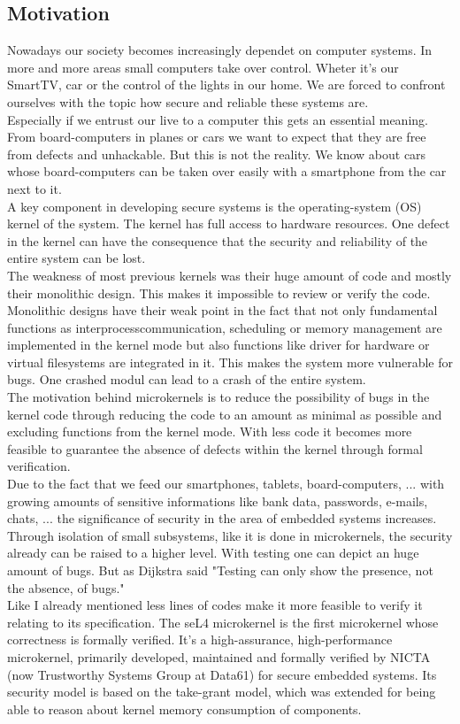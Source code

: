 \documentclass[11pt,a4paper,twoside]{article}
\begin{document}
	\subsection{Motivation}
Nowadays our society becomes increasingly dependet on computer systems. In more and more areas small computers take over control. Wheter it's our SmartTV, car or the control of the lights in our home. We are forced to confront ourselves with the topic how secure and reliable these systems are. \\
Especially if we entrust our live to a computer this gets an essential meaning. From board-computers in planes or cars we want to expect that they are free from defects and unhackable. But this is not the reality. We know about cars whose board-computers can be taken over easily with a smartphone from the car next to it. \\
A key component in developing secure systems is the operating-system (OS) kernel of the system. The kernel has full access to hardware resources. One defect in the kernel can have the consequence that the security and reliability of the entire system can be lost. \\
The weakness of most previous kernels was their huge amount of code and mostly their monolithic design. This makes it impossible to review or verify the code. Monolithic designs have their weak point in the fact that not only fundamental functions as interprocesscommunication, scheduling or memory management are implemented in the kernel mode but also functions like driver for hardware or virtual filesystems are integrated in it. This makes the system more vulnerable for bugs. One crashed modul can lead to a crash of the entire system. \\
The motivation behind microkernels is to reduce the  possibility of bugs in the kernel code through reducing the code to an amount as minimal as possible and excluding functions from the kernel mode. With less code it becomes more feasible to guarantee the absence of defects within the kernel through formal verification.\\
Due to the fact that we feed our smartphones, tablets, board-computers, ... with growing amounts of sensitive informations like bank data, passwords, e-mails, chats, ... the significance of security in the area of embedded systems increases. \\
Through isolation of small subsystems, like it is done in microkernels, the security already can be raised to a higher level. With testing one can depict an huge amount of bugs. But as Dijkstra said "Testing can only show the presence, not the absence, of bugs." \cite{EngTec} \\
Like I already mentioned less lines of codes make it more feasible to verify it relating to its specification. 
The seL4 microkernel is the first microkernel whose correctness is formally verified. It's a high-assurance, high-performance microkernel, primarily developed, maintained and formally verified by NICTA (now Trustworthy Systems Group at Data61) for secure embedded systems. Its security model is based on the take-grant model, which was extended for being able to reason about kernel memory consumption of components. 
\end{document}
